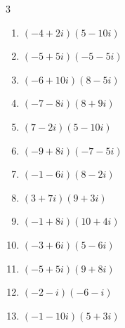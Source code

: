 \begin{multicols}{3}
\begin{enumerate}
        \phantom{$\displaystyle =76+100i$}

  \item $\displaystyle (-4+2i)(5-10i)$

        \phantom{$\displaystyle =50i$}

  \item $\displaystyle (-5+5i)(-5-5i)$

        \phantom{$\displaystyle =50$}

  \item $\displaystyle (-6+10i)(8-5i)$

        \phantom{$\displaystyle =2+110i$}

  \item $\displaystyle (-7-8i)(8+9i)$

        \phantom{$\displaystyle =16-127i$}

  \item $\displaystyle (7-2i)(5-10i)$

        \phantom{$\displaystyle =15-80i$}

  \item $\displaystyle (-9+8i)(-7-5i)$

        \phantom{$\displaystyle =103-11i$}

  \item $\displaystyle (-1-6i)(8-2i)$

        \phantom{$\displaystyle =-20-46i$}

\columnbreak %

  \item $\displaystyle (3+7i)(9+3i)$

        \phantom{$\displaystyle =6+72i$}

  \item $\displaystyle (-1+8i)(10+4i)$

        \phantom{$\displaystyle =-42+76i$}

  \item $\displaystyle (-3+6i)(5-6i)$

        \phantom{$\displaystyle =21+48i$}

  \item $\displaystyle (-5+5i)(9+8i)$

        \phantom{$\displaystyle =-85+5i$}

  \item $\displaystyle (-2-i)(-6-i)$

        \phantom{$\displaystyle =11+8i$}

  \item $\displaystyle (-1-10i)(5+3i)$


\end{enumerate}
\end{multicols}
